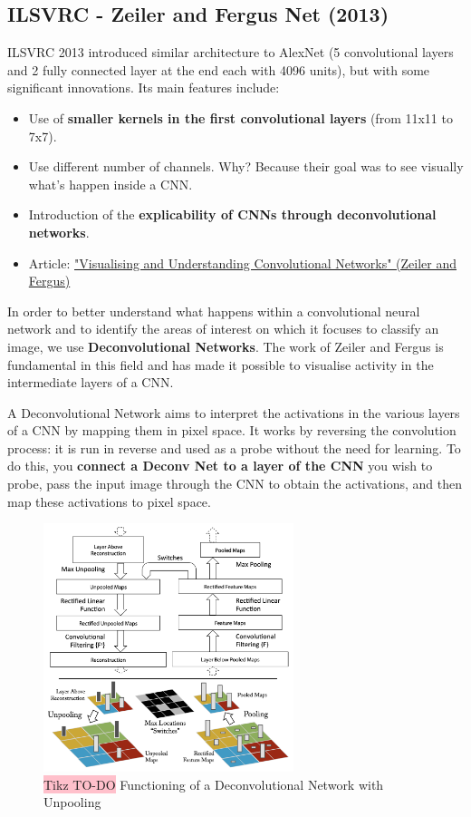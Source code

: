 \subsection{ILSVRC - Zeiler and Fergus Net (2013)}
ILSVRC 2013 introduced similar architecture to AlexNet (5 convolutional layers and 2 fully connected layer at the end each with 4096 units), but with some significant innovations. Its main features include:
\begin{itemize}
    \item Use of \textbf{smaller kernels in the first convolutional layers} (from 11x11 to 7x7).
    \item Use different number of channels. Why? Because their goal was to see visually what's happen inside a CNN.
    \item Introduction of the \textbf{explicability of CNNs through deconvolutional networks}.
    \item Article: \href{https://arxiv.org/pdf/1311.2901.pdf}{"Visualising and Understanding Convolutional Networks" (Zeiler and Fergus)}
\end{itemize}

In order to better understand what happens within a convolutional neural network and to identify the areas of interest on which it focuses to classify an image, we use \textbf{Deconvolutional Networks}. The work of Zeiler and Fergus is fundamental in this field and has made it possible to visualise activity in the intermediate layers of a CNN.

A Deconvolutional Network aims to interpret the activations in the various layers of a CNN by mapping them in pixel space. It works by reversing the convolution process: it is run in reverse and used as a probe without the need for learning. To do this, you \textbf{connect a Deconv Net to a layer of the CNN} you wish to probe, pass the input image through the CNN to obtain the activations, and then map these activations to pixel space.

\begin{figure}[!htbp]
    \centering
    \includegraphics[width=0.65\textwidth]{tikz/chapter5 - Deconvolutional Networks.png}
    \caption{{\color{red}\colorbox{pink}{Tikz TO-DO}} Functioning of a Deconvolutional Network with Unpooling}
\end{figure}

